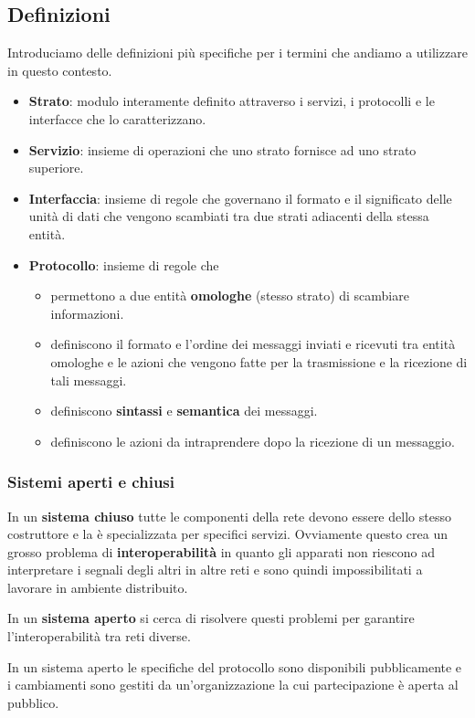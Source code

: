 \subsection{Definizioni}
Introduciamo delle definizioni più specifiche per i termini che andiamo a utilizzare in questo 
contesto.
\begin{itemize}
	\item \textbf{Strato}: modulo interamente definito attraverso i servizi, i protocolli e le 
		interfacce che lo caratterizzano.
	\item \textbf{Servizio}: insieme di operazioni che uno strato fornisce ad uno strato superiore.
	\item \textbf{Interfaccia}: insieme di regole che governano il formato e il significato delle 
		unità di dati che vengono scambiati tra due strati adiacenti della stessa entità.
	\item \textbf{Protocollo}: insieme di regole che
		\begin{itemize}
			\item permettono a due entità \textbf{omologhe} (stesso strato) di scambiare
				informazioni.
			\item definiscono il formato e l'ordine dei messaggi inviati e ricevuti tra entità
				omologhe e le azioni che vengono fatte per la trasmissione e la ricezione di 
				tali messaggi.
			\item definiscono \textbf{sintassi} e \textbf{semantica} dei messaggi.
			\item definiscono le azioni da intraprendere dopo la ricezione di un messaggio.
		\end{itemize}
\end{itemize}

\subsubsection{Sistemi aperti e chiusi}
In un \textbf{sistema chiuso} tutte le componenti della rete devono essere dello stesso costruttore
e la è specializzata per specifici servizi. Ovviamente questo crea un grosso problema di
\textbf{interoperabilità} in quanto gli apparati non riescono ad interpretare i segnali degli altri
in altre reti e sono quindi impossibilitati a lavorare in ambiente distribuito.

In un \textbf{sistema aperto} si cerca di risolvere questi problemi per garantire 
l'interoperabilità tra reti diverse.

In un sistema aperto le specifiche del protocollo sono disponibili pubblicamente e i cambiamenti 
sono gestiti da un'organizzazione la cui partecipazione è aperta al pubblico.

